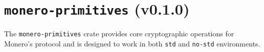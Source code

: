\documentclass[12pt,a4paper]{article}
\begin{document}






\section{\texttt{monero-primitives} (v0.1.0)}
The \texttt{monero-primitives} crate provides core cryptographic operations for Monero’s protocol and is designed to work in both \texttt{std} and \texttt{no-std} environments.
\end{document}
